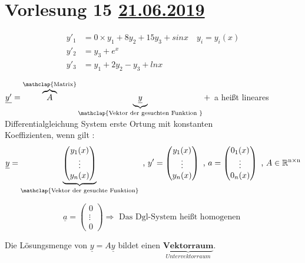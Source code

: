 \section{Vorlesung 15 \href{https://tu-dresden.de/mn/math/algebra/das-institut/beschaeftigte/antje-noack/ressourcen/dateien/v120-1/MathMethInf15.pdf?lang=en}{21.06.2019}}
\begin{example}
\begin{align*}
y'_1 &= 0 \times y_1 + 8 y_2 + 15 y_3 + sinx \quad y_i = y_i(x)\\
y'_2 &= y_3 + e^x\\
y'_3 &= y_1 + 2 y_2 - y_3 + lnx 
\end{align*}
\end{example}
\begin{definition}
$\underline{y'} =\overbrace{A}^{\mathclap{\text{Matrix}}}\underbrace{\underline{y}}_{\mathclap{\text{Vektor der gesuchten Funktion }}} +$ a heißt lineares Differentialgleichung System erste Ortung mit konstanten\\
Koeffizienten, wenn gilt :
\begin{gather*}
\underline{y} =\underbrace{\begin{pmatrix}
y_1(x)\\
\vdots\\
y_n(x)
\end{pmatrix}}_{\mathclap{\text{Vektor der gesuchte Funktion}}} \text{ , } 
y' = \begin{pmatrix}
y_1(x)\\
\vdots\\
y_n(x)
\end{pmatrix}
\text{ , } 
a = \begin{pmatrix}
0_1(x)\\
\vdots\\
0_n(x)
\end{pmatrix}
\text{ , }
A \in \mathbb{R^{\text{n} \times \text{n}}}
\end{gather*}
\end{definition}
\begin{remark}
\[ \underline{a} = \begin{pmatrix}
0\\
\vdots\\
0
\end{pmatrix} \Rightarrow \text{ Das Dgl-System heißt homogenen }  \]
\end{remark}
\begin{remark}
Die Lösungsmenge von $\underline{y} = A \underline{y}$ bildet einen $\underbrace{\textbf{Vektorraum}}_{Untervektorraum}$.
\end{remark}
